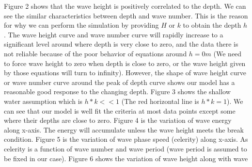 %
Figure 2 shows that the wave height is positively correlated to the depth. We can see the similar characteristics between depth and wave number. This is the reason for why we can perform the simulation by providing ${H}$ or ${k}$ to obtain the depth ${h}$. The wave height curve and wave number curve will rapidly increase to a significant level around where depth is very close to zero, and the data there is not reliable because of the poor behavior of equations around $h=0 m$ (We need to force wave height to zero when depth is close to zero, or the wave height given by those equations will turn to infinity). However, the shape of wave height curve or wave number curve around the peak of depth curve shows our model has a reasonable good response to the changing depth.
Figure 3 shows the shallow water assumption which is $h*k<<1$ (The red horizontal line is $h*k=1$). We can see that our model is well fit the criteria at most data points except some where their depths are close to zero.
Figure 4 is the variation of wave energy along x-axis. The energy will accumulate unless the wave height meets the break condition.
Figure 5 is the variation of wave phase speed (celerity) along x-axis. As celerity is a function of wave number and wave period (wave period is assumed to be fixed in our case). 
Figure 6 shows the variation of wave height along with wave 


